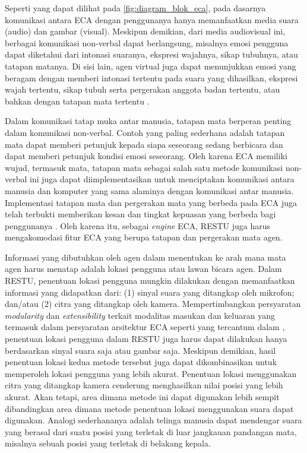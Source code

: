 Seperti yang dapat dilihat pada \autoref{fig:diagram_blok_eca}, pada dasarnya komunikasi antara ECA dengan penggunanya hanya memanfaatkan media suara (audio) dan gambar (visual). Meskipun demikian, dari media audiovisual ini, berbagai komunikasi non-verbal dapat berlangsung, misalnya emosi pengguna dapat diketahui dari intonasi suaranya, ekspresi wajahnya, sikap tubuhnya, atau tatapan matanya. Di sisi lain, agen virtual juga dapat menunjukkan emosi yang beragam dengan memberi intonasi tertentu pada suara yang dihasilkan, ekspresi wajah tertentu, sikap tubuh serta pergerakan anggota badan tertentu, atau bahkan dengan tatapan mata tertentu \cite{morency2006, hartmann2005}.



Dalam komunikasi tatap muka antar manusia, tatapan mata berperan penting dalam komunikasi non-verbal. Contoh yang paling sederhana adalah tatapan mata dapat memberi petunjuk kepada siapa seseorang sedang berbicara dan dapat memberi petunjuk kondisi emosi seseorang. Oleh karena ECA memiliki wujud, termasuk mata, tatapan mata sebagai salah satu metode komunikasi non-verbal ini juga dapat diimplementasikan untuk menciptakan komunikasi antara manusia dan komputer yang sama alaminya dengan komunikasi antar manusia. Implementasi tatapan mata dan pergerakan mata yang berbeda pada ECA juga telah terbukti memberikan kesan dan tingkat kepuasan yang berbeda bagi penggunanya \cite{lee2002, vanes2002}. Oleh karena itu, sebagai \textit{engine} ECA, RESTU juga harus mengakomodasi fitur ECA yang berupa tatapan dan pergerakan mata agen.


Informasi yang dibutuhkan oleh agen dalam menentukan ke arah mana mata agen harus menatap adalah lokasi pengguna atau lawan bicara agen. Dalam RESTU, penentuan lokasi pengguna mungkin dilakukan dengan memanfaatkan informasi yang didapatkan dari: (1) sinyal suara yang ditangkap oleh mikrofon; dan/atau (2) citra yang ditangkap oleh kamera. Mempertimbangkan persyaratan \textit{modularity} dan \textit{extensibility} terkait modalitas masukan dan keluaran yang termasuk dalam persyaratan arsitektur ECA seperti yang tercantum dalam \cite{cassell1998}, penentuan lokasi pengguna dalam RESTU juga harus dapat dilakukan hanya berdasarkan sinyal suara saja atau gambar saja. Meskipun demikian, hasil penentuan lokasi kedua metode tersebut juga dapat dikombinasikan untuk memperoleh lokasi pengguna yang lebih akurat. Penentuan lokasi menggunakan citra yang ditangkap kamera cenderung menghasilkan nilai posisi yang lebih akurat. Akan tetapi, area dimana metode ini dapat digunakan lebih sempit dibandingkan area dimana metode penentuan lokasi menggunakan suara dapat digunakan. Analogi sederhananya adalah telinga manusia dapat mendengar suara yang berasal dari suatu posisi yang terletak di luar jangkauan pandangan mata, misalnya sebuah posisi yang terletak di belakang kepala.
